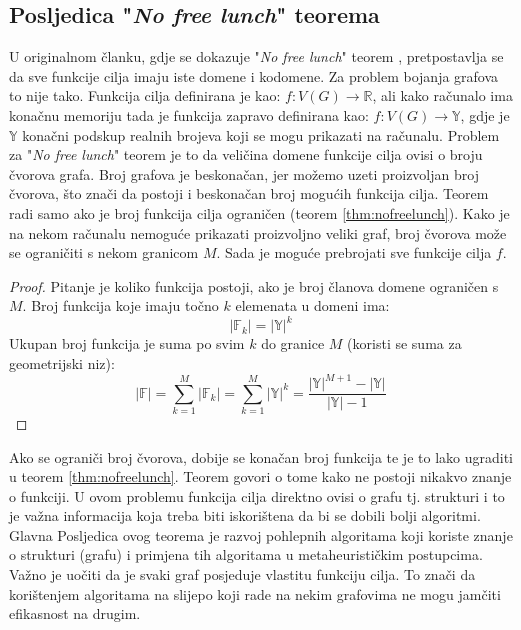 \documentclass[times, utf8, diplomski, numeric]{fer}
\begin{document}
\subsection{Posljedica "\emph{No free lunch}" teorema}

U originalnom članku, gdje se dokazuje "\emph{No free lunch}" teorem \cite{lit15}, pretpostavlja se da sve funkcije cilja imaju iste domene i kodomene. Za problem bojanja grafova to nije tako. Funkcija cilja definirana je kao: $f:V(G) \rightarrow \mathbb{R}$, ali kako računalo ima konačnu memoriju tada je funkcija zapravo definirana kao: $f:V(G) \rightarrow \mathbb{Y}$, gdje je $\mathbb{Y}$ konačni podskup realnih brojeva koji se mogu prikazati na računalu. Problem za "\emph{No free lunch}" teorem je to da veličina domene funkcije cilja ovisi o broju čvorova grafa. Broj grafova je beskonačan, jer možemo uzeti proizvoljan broj čvorova, što znači da postoji i beskonačan broj mogućih funkcija cilja. Teorem radi samo ako je broj funkcija cilja ograničen (teorem \ref{thm:nofreelunch}). Kako je na nekom računalu nemoguće prikazati proizvoljno veliki graf, broj čvorova može se ograničiti s nekom granicom $M$. Sada je moguće prebrojati sve funkcije cilja $f$.

\begin{proof}
Pitanje je koliko funkcija postoji, ako je broj članova domene ograničen s $M$.
Broj funkcija koje imaju točno $k$ elemenata u domeni ima:
	\begin{equation}
		|\mathbb{F}_k| = |\mathbb{Y}|^k
	\end{equation}
Ukupan broj funkcija je suma po svim $k$ do granice $M$ (koristi se suma za geometrijski niz):
	\begin{equation}
		|\mathbb{F}| = \sum_{k=1}^{M}|\mathbb{F}_k| = \sum_{k=1}^{M} |\mathbb{Y}|^k = \frac{|\mathbb{Y}|^{M+1}-|\mathbb{Y}|}{|\mathbb{Y}|-1}
	\end{equation}
\end{proof} 

Ako se ograniči broj čvorova, dobije se konačan broj funkcija te je to lako ugraditi u teorem \ref{thm:nofreelunch}. Teorem govori o tome kako ne postoji nikakvo znanje o funkciji. U ovom problemu funkcija cilja direktno ovisi o grafu tj. strukturi i to je važna informacija koja treba biti iskorištena da bi se dobili bolji algoritmi. Glavna Posljedica ovog teorema je razvoj pohlepnih algoritama koji koriste znanje o strukturi (grafu) i primjena tih algoritama u metaheurističkim postupcima. 
Važno je uočiti da je svaki graf posjeduje vlastitu funkciju cilja. To znači da korištenjem algoritama na slijepo koji rade na nekim grafovima ne mogu jamčiti efikasnost na drugim.
\end{document}
